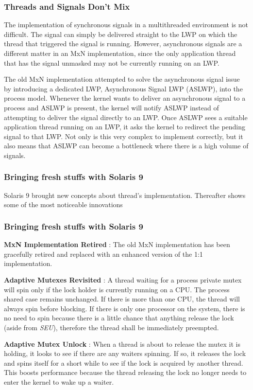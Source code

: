 \begin{frame}
\frametitle{Threads and Signals Don't Mix}

The implementation of synchronous signals in a multithreaded environment is not difficult. The signal can simply be delivered straight to the LWP on which the thread that triggered the signal is running. However, asynchronous signals are a different matter in an MxN implementation, since the only application thread that has the signal unmasked may not be currently running on an LWP.

\-

The old MxN implementation attempted to solve the asynchronous signal issue by introducing a dedicated LWP, Asynchronous Signal LWP (ASLWP), into the process model. Whenever the kernel wants to deliver an asynchronous signal to a process and ASLWP is present, the kernel will notify ASLWP instead of attempting to deliver the signal directly to an LWP. Once ASLWP sees a suitable application thread running on an LWP, it asks the kernel to redirect the pending signal to that LWP. Not only is this very complex to implement correctly, but it also means that ASLWP can become a bottleneck where there is a high volume of signals.

\end{frame}


\begin{frame}
\frametitle{Bringing fresh stuffs with Solaris 9}

Solaris 9 brought new concepts about thread's implementation. Thereafter shows some of the most noticeable innovations \etc{}

\end{frame}


\begin{frame}
\frametitle{Bringing fresh stuffs with Solaris 9}

\textbf{MxN Implementation Retired} : The old MxN implementation has been gracefully retired and replaced with an enhanced version of the 1:1 implementation.

\-

\textbf{Adaptive Mutexes Revisited} : A thread waiting for a process private mutex will spin only if the lock holder is currently running on a CPU. The process shared case remains unchanged. If there is more than one CPU, the thread will always spin before blocking. If there is only one processor on the system, there is no need to spin because there is a little chance that anything release the lock (aside from \textit{SEU}), therefore the thread shall be immediately preempted.

\-

\textbf{Adaptive Mutex Unlock} : When a thread is about to release the mutex it is holding, it looks to see if there are any waiters spinning. If so, it releases the lock and spins itself for a short while to see if the lock is acquired by another thread. This boosts performance because the thread releasing the lock no longer needs to enter the kernel to wake up a waiter.

\end{frame}

